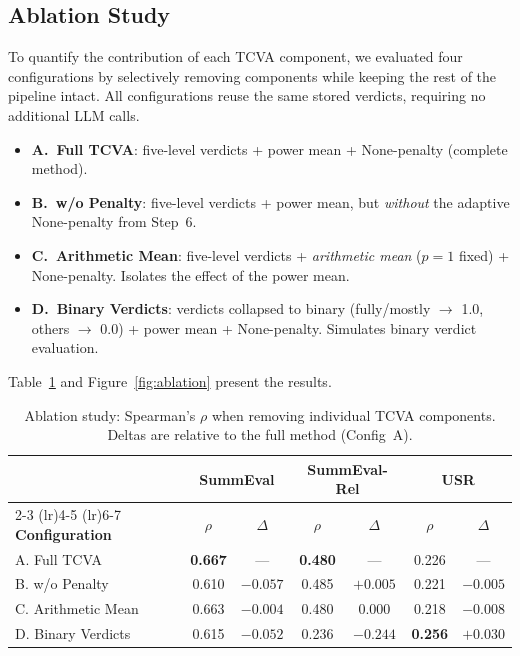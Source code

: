 \documentclass[sn-basic]{sn-jnl}
\theoremstyle{thmstyleone}%
\theoremstyle{thmstyletwo}%
\theoremstyle{thmstylethree}%
\begin{document}
\subsection{Ablation Study}

To quantify the contribution of each TCVA component, we evaluated four configurations by selectively removing components while keeping the rest of the pipeline intact. All configurations reuse the same stored verdicts, requiring no additional LLM calls.

\begin{itemize}
\item \textbf{A.~Full TCVA}: five-level verdicts + power mean + None-penalty (complete method).
\item \textbf{B.~w/o Penalty}: five-level verdicts + power mean, but \textit{without} the adaptive None-penalty from Step~6.
\item \textbf{C.~Arithmetic Mean}: five-level verdicts + \textit{arithmetic mean} ($p=1$ fixed) + None-penalty. Isolates the effect of the power mean.
\item \textbf{D.~Binary Verdicts}: verdicts collapsed to binary (fully/mostly $\to$ 1.0, others $\to$ 0.0) + power mean + None-penalty. Simulates binary verdict evaluation.
\end{itemize}

Table~\ref{tab:ablation} and Figure~\ref{fig:ablation} present the results.

\begin{table}[h]
\caption{Ablation study: Spearman's $\rho$ when removing individual TCVA components. Deltas are relative to the full method (Config~A).}
\label{tab:ablation}
\centering
\begin{tabular}{@{}lcccccc@{}}
\toprule
& \multicolumn{2}{c}{\textbf{SummEval}} & \multicolumn{2}{c}{\textbf{SummEval-Rel}} & \multicolumn{2}{c}{\textbf{USR}} \\
\cmidrule(lr){2-3} \cmidrule(lr){4-5} \cmidrule(lr){6-7}
\textbf{Configuration} & $\rho$ & $\Delta$ & $\rho$ & $\Delta$ & $\rho$ & $\Delta$ \\
\midrule
A. Full TCVA & \textbf{0.667} & --- & \textbf{0.480} & --- & 0.226 & --- \\
B. w/o Penalty & 0.610 & $-0.057$ & 0.485 & $+0.005$ & 0.221 & $-0.005$ \\
C. Arithmetic Mean & 0.663 & $-0.004$ & 0.480 & $0.000$ & 0.218 & $-0.008$ \\
D. Binary Verdicts & 0.615 & $-0.052$ & 0.236 & $-0.244$ & \textbf{0.256} & $+0.030$ \\
\bottomrule
\end{tabular}
\end{table}
\end{document}
